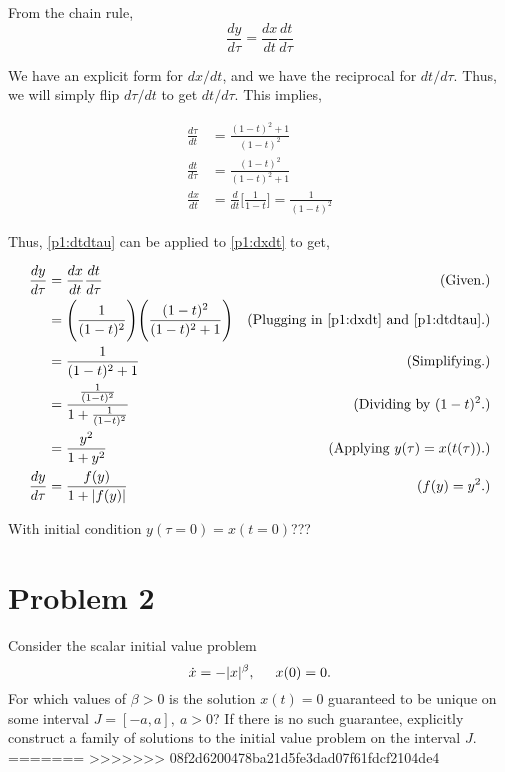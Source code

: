 \begin{solution}
    From the chain rule,
    \[\frac{dy}{d\tau} = \frac{dx}{dt}\frac{dt}{d\tau}\]

    We have an explicit form for $dx/dt$, and we have the reciprocal for $dt/d\tau$. Thus, we will simply flip $d\tau/dt$ to get $dt/d\tau$. This implies,

    \alignbreak
    \begin{align}
        \frac{d\tau}{dt} &= \frac{(1 - t)^2 + 1}{(1 - t)^2} \nonumber\\
        \frac{dt}{d\tau} &= \frac{(1 - t)^2}{(1 - t)^2 + 1} \label{p1:dtdtau}\\  
        \frac{dx}{dt} &= \frac{d}{dt}\Bigg[ \frac{1}{1 - t}\Bigg] = \frac{1}{(1 - t)^2} \label{p1:dxdt}
    \end{align}
    \alignbreak

    Thus, \ref{p1:dtdtau} can be applied to \ref{p1:dxdt} to get, 

    \alignbreak
    \begin{align}
        \frac{dy}{d\tau} &= \frac{dx}{dt}\frac{dt}{d\tau} &\text{(Given.)}\nonumber\\
        &= \Bigg(\frac{1}{(1 - t)^2}\Bigg)\Bigg( \frac{(1 - t)^2}{(1 - t)^2 + 1}\Bigg) &\text{(Plugging in \ref{p1:dxdt} and \ref{p1:dtdtau}.)}\nonumber\\
        &= \frac{1}{(1 - t)^2 + 1} &\text{(Simplifying.)}\nonumber\\
        &= \frac{\frac{1}{(1 - t)^2}}{1 + \frac{1}{(1 - t)^2}} &\text{(Dividing by $(1 - t)^2$.)}\nonumber\\
        &= \frac{y^2}{1 + y^2} &\text{(Applying $y(\tau) = x(t(\tau))$.)}\nonumber\\
        \frac{dy}{d\tau} &= \frac{f(y)}{1 + |f(y)|} &\text{($f(y) = y^2$.)}\nonumber
    \end{align}
    \alignbreak

    With initial condition $y(\tau = 0) = x(t = 0)$???
\end{solution}%

\newpage

\section{Problem 2}
Consider the scalar initial value problem
\[
\dot{x} = -|x|^\beta, \hspace{5mm} x(0) = 0.
\]
For which values of $\beta > 0$ is the solution $x(t) = 0$ guaranteed to be unique on some interval $J = [-a, a], \ a > 0$? If there is no such guarantee, explicitly construct a family of solutions to the initial value problem on the interval $J$.   
\partbreak
=======
>>>>>>> 08f2d6200478ba21d5fe3dad07f61fdcf2104de4

